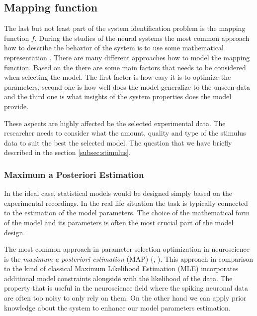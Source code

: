 \subsection{Mapping function}
\label{subsec:mapping_function}
The last but not least part of the system identification problem is the mapping 
function $f$. During the studies of the neural systems the most common 
approach how to describe the behavior of the system is to use some mathematical 
representation \citet{annurev:/content/journals/10.1146/annurev-vision-091718-014731}.
There are many different approaches how to model the mapping function. Based on the 
\citet{annurev:/content/journals/10.1146/annurev-vision-091718-014731} there are 
some main factors that needs to be considered when selecting the model. The 
first factor is how easy it is to optimize the parameters, second one is how well does
the model generalize to the unseen data and the third one is what insights of the
system properties does the model provide.

These aspects are highly affected be the selected experimental data. The researcher 
needs to consider what the amount, quality and type of the stimulus data to suit 
the best the selected model. The question that we have briefly described in the section 
\ref{subsec:stimulus}.

\subsubsection{Maximum a Posteriori Estimation}
\label{subsubsec:map_estimation}
In the ideal case, statistical models would be designed simply based on the 
experimental recordings. In the real life situation the task is typically connected
to the estimation of the model parameters. The choice of the mathematical form of the 
model and its parameters is often the most crucial part of the model design. 

The most common approach in parameter selection optimization in neuroscience is the 
\emph{maximum a posteriori estimation} (MAP) 
(\citet{wu2006complete}, 
\citet{annurev:/content/journals/10.1146/annurev-vision-091718-014731}). This approach
in comparison to the kind of classical Maximum Likelihood Estimation (MLE) 
\citet{alpaydin2020introduction} incorporates additional model constraints alongside
with the likelihood of the data. The property that is useful in the neuroscience 
field where the spiking neuronal data are often too noisy to only rely on them.
On the other hand we can apply prior knowledge about the system to enhance our model
parameters estimation. 

